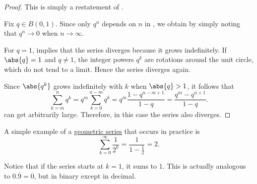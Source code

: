 \begin{proof}
   This is simply a restatement of .

   Fix \( q \in B(0, 1) \). Since only \( q^n \) depends on \( n \) in , we obtain  by simply noting that \( q^n \to 0 \) when \( n \to \infty \).

   For \( q = 1 \),  implies that the series diverges because it grows indefinitely. If \( \abs{q} = 1 \) and \( q \neq 1 \), the integer powers \( q^k \) are rotations around the unit circle, which do not tend to a limit. Hence the series diverges again.

  Since \( \abs{q^k} \) grows indefinitely with \( k \) when \( \abs{q} > 1 \), it follows that
  \begin{equation*}\label{thm:geometric_progression/cauchy_partial_sum}
    \sum_{k=m}^n q^k
    =
    q^m \sum_{k=0}^{n-m} q^k
    =
    q^m \frac {1 - q^{n-m+1}} {1 - q}
    =
    \frac {q^m - q^{n+1}} {1 - q}.
  \end{equation*}
  can get arbitrarily large. Therefore, in this case the series also diverges.
\end{proof}

\begin{example}\label{ex:series_of_reciprocal_powers_of_two}
  A simple example of a \hyperref[def:geometric_progression/series]{geometric series} that occurs in practice is
  \begin{equation}\label{ex:series_of_reciprocal_powers_of_two/series}
    \sum_{k=0}^\infty \frac 1 {2^k} = \frac 1 {1 - \frac 1 2} = 2.
  \end{equation}

  Notice that if the series starts at \( k = 1 \), it sums to \( 1 \). This is actually analogous to \( 0.\overline{9} = 0 \), but in binary except in decimal.
\end{example}

